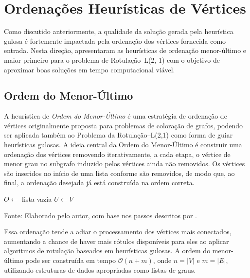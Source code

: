 \section{Ordenações Heurísticas de Vértices}

Como discutido anteriormente, a qualidade da solução gerada pela heurística gulosa é fortemente impactada pela ordenação dos vértices fornecida como entrada. Nesta direção,  apresentaram as heurísticas de ordenação menor-último e maior-primeiro para o problema de Rotulação–L(2, 1) com o objetivo de aproximar boas soluções em tempo computacional viável.

\subsection{Ordem do Menor-Último}

A heurística de \textit{Ordem do Menor-Último} é uma estratégia de ordenação de vértices originalmente proposta para problemas de coloração de grafos, podendo ser aplicada também ao Problema da Rotulação–L(2,1) como forma de guiar heurísticas gulosas. A ideia central da Ordem do Menor-Último é construir uma ordenação dos vértices removendo iterativamente, a cada etapa, o vértice de menor grau no subgrafo induzido pelos vértices ainda não removidos. Os vértices são inseridos no início de uma lista conforme são removidos, de modo que, ao final, a ordenação desejada já está construída na ordem correta.

\begin{algorithm}[H]
\caption{Ordem do Menor-Último}
\label{alg:menor-ultimo}

$O \gets$ lista vazia\;
$U \gets V$ 
\end{algorithm}
\noindent Fonte: Elaborado pelo autor, com base nos passos descritos por .

Essa ordenação tende a adiar o processamento dos vértices mais conectados, aumentando a chance de haver mais rótulos disponíveis para eles ao aplicar algoritmos de rotulação baseados em heurísticas gulosas. A ordem do menor-último pode ser construída em tempo \( \mathcal{O}(n + m) \), onde \( n = |V| \) e \( m = |E| \), utilizando estruturas de dados apropriadas como listas de graus.


